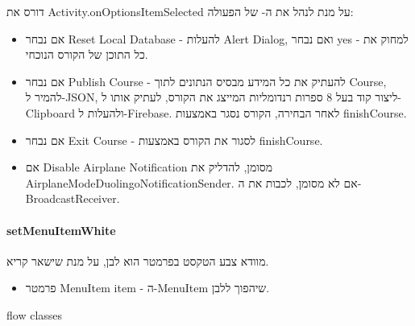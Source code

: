 דורס את Activity.onOptionsItemSelected על מנת לנהל את ה- של הפעולה:

\begin{itemize}
  \item אם נבחר Reset Local Database - להעלות Alert Dialog, ואם נבחר yes - למחוק את כל התוכן של הקורס הנוכחי.
  \item אם נבחר Publish Course - להעתיק את כל המידע מבסיס הנתונים לתוך Course, להמיר ל-JSON, ליצור קוד בעל 8 ספרות רנדומליות המייצג את הקורס, לעתיק אותו ל-Clipboard ולהעלות ל-Firebase.
    לאחר הבחירה, הקורס נסגר באמצעות finishCourse.
  \item אם נבחר Exit Course - לסגור את הקורס באמצעות finishCourse.
  \item אם Disable Airplane Notification מסומן, להדליק את AirplaneModeDuolingoNotificationSender. אם לא מסומן, לכבות את ה-BroadcastReceiver.
\end{itemize}

\paragraph{setMenuItemWhite}

מוודא צבע הטקסט בפרמטר הוא לבן, על מנת שישאר קריא.

\begin{itemize}
  \item פרמטר MenuItem item - ה-MenuItem שיהפוך ללבן.
\end{itemize}

{flow}
\newpage
{classes}
